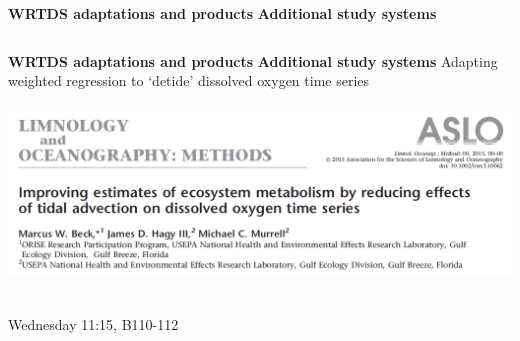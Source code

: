 \documentclass[serif]{beamer}\usepackage[]{graphicx}\usepackage[]{color}
\begin{document}
\begin{frame}{\textbf{WRTDS adaptations and products}}{\textbf{ Additional study systems}}
\begin{columns}
\begin{column}{0.65\textwidth}
\end{column}
\end{columns}
\end{frame}

\begin{frame}{\textbf{WRTDS adaptations and products}}{\textbf{ Additional study systems}}
Adapting weighted regression to `detide' dissolved oxygen time series \\~\\
\includegraphics[width = \textwidth]{fig/lopaper.png} \\~\\
\centerline{\alert{Wednesday 11:15, B110-112}}
\end{frame}
\end{document}

